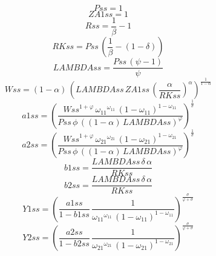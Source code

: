 \begin{dmath*}
Pss = 1
\end{dmath*}
\begin{dmath*}
ZA1ss = 1
\end{dmath*}
\begin{dmath*}
Rss = \frac{1}{{{\beta}}}-1
\end{dmath*}
\begin{dmath*}
RKss = {Pss}\, \left(\frac{1}{{{\beta}}}-\left(1-{{\delta}}\right)\right)
\end{dmath*}
\begin{dmath*}
LAMBDAss = \frac{{Pss}\, \left({{\psi}}-1\right)}{{{\psi}}}
\end{dmath*}
\begin{dmath*}
Wss = \left(1-{{\alpha}}\right)\, \left({LAMBDAss}\, {ZA1ss}\, \left(\frac{{{\alpha}}}{{RKss}}\right)^{{{\alpha}}}\right)^{\frac{1}{1-{{\alpha}}}}
\end{dmath*}
\begin{dmath*}
a1ss = \left(\frac{{Wss}^{1+{{\varphi}}}\, {{\omega_{11}}}^{{{\omega_{11}}}}\, \left(1-{{\omega_{11}}}\right)^{1-{{\omega_{11}}}}}{{Pss}\, {{\phi}}\, \left(\left(1-{{\alpha}}\right)\, {LAMBDAss}\right)^{{{\varphi}}}}\right)^{\frac{1}{{{\sigma}}}}
\end{dmath*}
\begin{dmath*}
a2ss = \left(\frac{{Wss}^{1+{{\varphi}}}\, {{\omega_{21}}}^{{{\omega_{21}}}}\, \left(1-{{\omega_{21}}}\right)^{1-{{\omega_{21}}}}}{{Pss}\, {{\phi}}\, \left(\left(1-{{\alpha}}\right)\, {LAMBDAss}\right)^{{{\varphi}}}}\right)^{\frac{1}{{{\sigma}}}}
\end{dmath*}
\begin{dmath*}
b1ss = \frac{{LAMBDAss}\, {{\delta}}\, {{\alpha}}}{{RKss}}
\end{dmath*}
\begin{dmath*}
b2ss = \frac{{LAMBDAss}\, {{\delta}}\, {{\alpha}}}{{RKss}}
\end{dmath*}
\begin{dmath*}
Y1ss = \left(\frac{{a1ss}}{1-{b1ss}}\, \frac{1}{{{\omega_{11}}}^{{{\omega_{11}}}}\, \left(1-{{\omega_{11}}}\right)^{1-{{\omega_{11}}}}}\right)^{\frac{{{\sigma}}}{{{\varphi}}+{{\sigma}}}}
\end{dmath*}
\begin{dmath*}
Y2ss = \left(\frac{{a2ss}}{1-{b2ss}}\, \frac{1}{{{\omega_{21}}}^{{{\omega_{21}}}}\, \left(1-{{\omega_{21}}}\right)^{1-{{\omega_{21}}}}}\right)^{\frac{{{\sigma}}}{{{\varphi}}+{{\sigma}}}}
\end{dmath*}
